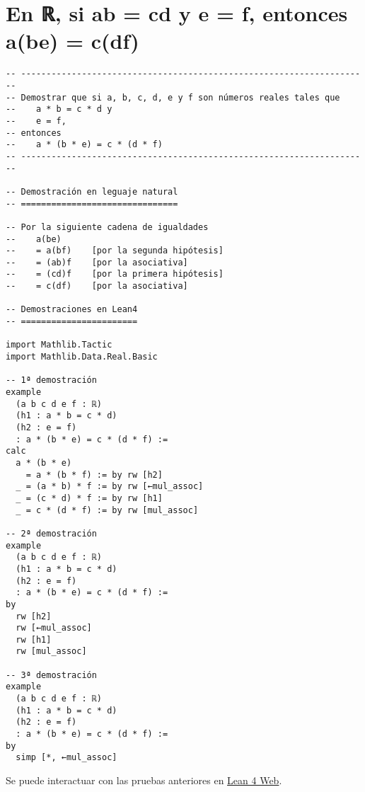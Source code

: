 \section{En ℝ, si ab = cd y e = f, entonces a(be) = c(df)}
\label{sec:org45a8cae}
\begin{verbatim}
-- ---------------------------------------------------------------------
-- Demostrar que si a, b, c, d, e y f son números reales tales que
--    a * b = c * d y
--    e = f,
-- entonces
--    a * (b * e) = c * (d * f)
-- ---------------------------------------------------------------------

-- Demostración en leguaje natural
-- ===============================

-- Por la siguiente cadena de igualdades
--    a(be)
--    = a(bf)    [por la segunda hipótesis]
--    = (ab)f    [por la asociativa]
--    = (cd)f    [por la primera hipótesis]
--    = c(df)    [por la asociativa]

-- Demostraciones en Lean4
-- =======================

import Mathlib.Tactic
import Mathlib.Data.Real.Basic

-- 1ª demostración
example
  (a b c d e f : ℝ)
  (h1 : a * b = c * d)
  (h2 : e = f)
  : a * (b * e) = c * (d * f) :=
calc
  a * (b * e)
    = a * (b * f) := by rw [h2]
  _ = (a * b) * f := by rw [←mul_assoc]
  _ = (c * d) * f := by rw [h1]
  _ = c * (d * f) := by rw [mul_assoc]

-- 2ª demostración
example
  (a b c d e f : ℝ)
  (h1 : a * b = c * d)
  (h2 : e = f)
  : a * (b * e) = c * (d * f) :=
by
  rw [h2]
  rw [←mul_assoc]
  rw [h1]
  rw [mul_assoc]

-- 3ª demostración
example
  (a b c d e f : ℝ)
  (h1 : a * b = c * d)
  (h2 : e = f)
  : a * (b * e) = c * (d * f) :=
by
  simp [*, ←mul_assoc]
\end{verbatim}
Se puede interactuar con las pruebas anteriores en \href{https://lean.math.hhu.de/\#url=https://raw.githubusercontent.com/jaalonso/Calculemus2/main/src/a(be)\_eq\_c(df).lean}{Lean 4 Web}.

